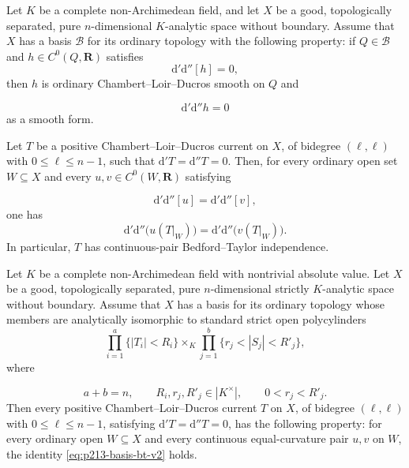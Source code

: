 
\begin{proposition}\label{prop:p213-hessian-regular-basis-v2-candidate}
Let \(K\) be a complete non-Archimedean field, and let \(X\) be a good,
topologically separated, pure \(n\)-dimensional \(K\)-analytic space without
boundary. Assume that \(X\) has a basis \(\mathscr B\) for its ordinary
topology with the following property: if \(Q\in\mathscr B\) and
\(h\in C^0(Q,\mathbf R)\) satisfies
\begin{equation}\label{eq:p213-basis-zero-current-v2}
                    \mathrm d'\mathrm d''[h]=0,
\end{equation}
then \(h\) is ordinary Chambert--Loir--Ducros smooth on \(Q\) and

\[
                    \mathrm d'\mathrm d''h=0
\]
as a smooth form.

Let \(T\) be a positive Chambert--Loir--Ducros current on \(X\), of bidegree
\((\ell,\ell)\) with \(0\leq\ell\leq n-1\), such that
\(\mathrm d'T=\mathrm d''T=0\). Then, for every ordinary open set
\(W\subseteq X\) and every \(u,v\in C^0(W,\mathbf R)\) satisfying

\[
                 \mathrm d'\mathrm d''[u]
                 =\mathrm d'\mathrm d''[v],
\]
one has
\begin{equation}\label{eq:p213-basis-bt-v2}
 \mathrm d'\mathrm d''\bigl(u(T|_W)\bigr)
 =\mathrm d'\mathrm d''\bigl(v(T|_W)\bigr).
\end{equation}
In particular, \(T\) has continuous-pair Bedford--Taylor independence.
\end{proposition}

\begin{corollary}\label{cor:p213-polycylinder-basis-v2-candidate}
Let \(K\) be a complete non-Archimedean field with nontrivial absolute
value. Let \(X\) be a good, topologically separated, pure
\(n\)-dimensional strictly \(K\)-analytic space without boundary. Assume that
\(X\) has a basis for its ordinary topology whose members are analytically
isomorphic to standard strict open polycylinders
\begin{equation}\label{eq:p213-standard-polycylinder-v2}
 \prod_{i=1}^{a}\{|T_i|<R_i\}
 \times_K
 \prod_{j=1}^{b}\{r_j<|S_j|<R'_j\},
\end{equation}
where

\[
 a+b=n,\qquad R_i,r_j,R'_j\in|K^\times|,
 \qquad 0<r_j<R'_j.
\]
Then every positive Chambert--Loir--Ducros current \(T\) on \(X\), of bidegree
\((\ell,\ell)\) with \(0\leq\ell\leq n-1\), satisfying
\(\mathrm d'T=\mathrm d''T=0\), has the following property: for every
ordinary open \(W\subseteq X\) and every continuous equal-curvature pair
\(u,v\) on \(W\), the identity \eqref{eq:p213-basis-bt-v2} holds.
\end{corollary}

